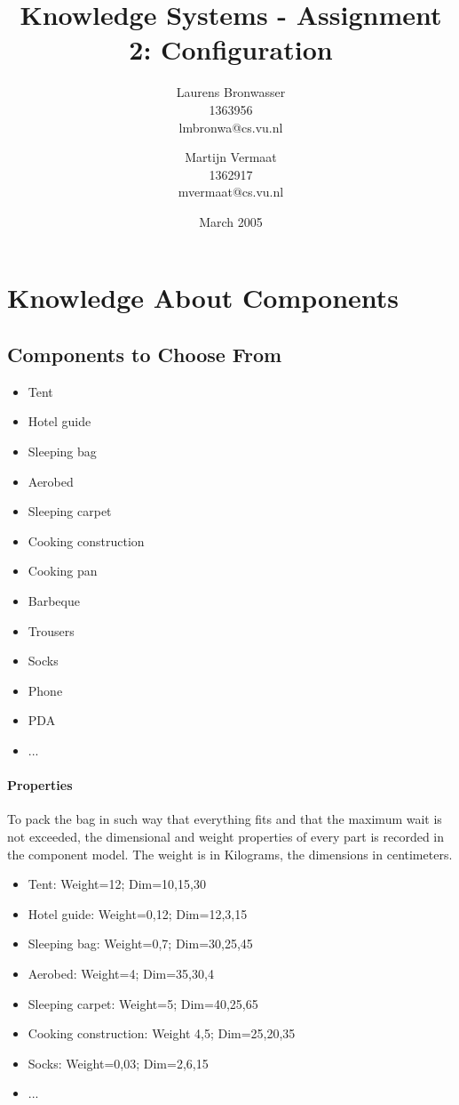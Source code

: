 \documentclass[a4paper,11pt]{article}
\title{Knowledge Systems - Assignment 2: Configuration}
\author{Laurens Bronwasser\\
1363956\\
lmbronwa@cs.vu.nl
\and
Martijn Vermaat\\
1362917\\
mvermaat@cs.vu.nl}
\date{March 2005}
\begin{document}
\maketitle




\tableofcontents


\section{Knowledge About Components}


\subsection*{Components to Choose From}

\begin{itemize}
\item Tent 
\item Hotel guide 
\item Sleeping bag 
\item Aerobed 
\item Sleeping carpet 
\item Cooking construction
\item Cooking pan
\item Barbeque
\item Trousers
\item Socks
\item Phone
\item PDA
\item ...
\end{itemize}

\paragraph{Properties}

To pack the bag in such way that everything fits and that the maximum wait is 
not exceeded, the dimensional and weight properties of every part is recorded in
the component model. The weight is in Kilograms, the dimensions in centimeters.

\begin{itemize}
\item Tent: Weight=12; Dim=10,15,30
\item Hotel guide: Weight=0,12; Dim=12,3,15
\item Sleeping bag: Weight=0,7; Dim=30,25,45
\item Aerobed: Weight=4; Dim=35,30,4
\item Sleeping carpet: Weight=5; Dim=40,25,65
\item Cooking construction: Weight 4,5; Dim=25,20,35
\item Socks: Weight=0,03; Dim=2,6,15
\item ...
\end{itemize}
\end{document}
